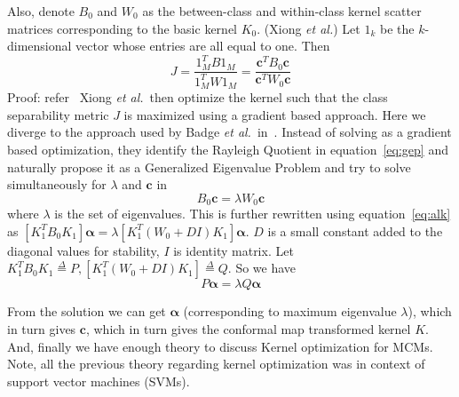 \documentclass[11pt]{article}
\newcommand{\etal}{{\em et al.}}
\begin{document}
Also, denote $B_0$ and $W_0$ as the between\nobreakdash-class and within\nobreakdash-class kernel
scatter matrices corresponding to the basic kernel $K_0$.
{\theorem (Xiong \etal) Let $1_k$ be the $k$\nobreakdash-dimensional vector whose
entries are all equal to one. Then
\begin{equation}
    \label{eq:gep}
    J=\frac{1_M^TB1_M}{1_M^TW1_M}=\frac{\mathbf{c}^TB_0\mathbf{c}}{\mathbf{c}^TW_0\mathbf{c}}
\end{equation}
Proof: refer~\cite{xiong}
}
Xiong \etal\ then optimize the kernel such that the class separability metric $J$
is maximized using a gradient based approach. Here we diverge to the approach
used by Badge \etal\ in~\cite{keropt}. Instead of solving as a gradient based
optimization, they identify the Rayleigh Quotient in equation~\ref{eq:gep} and
naturally propose it as a Generalized Eigenvalue Problem and try to solve
simultaneously for $\lambda$ and $\mathbf{c}$ in
\[B_0\mathbf{c}=\lambda W_0\mathbf{c}
\]
where $\lambda$ is the set of eigenvalues. This is further rewritten using
equation~\ref{eq:alk} as $[K_1^TB_0K_1]\mathbf{\alpha}=\lambda[K_1^T(W_0+DI)K_1]\mathbf{\alpha}$.
$D$ is a small constant added to the diagonal values for stability, $I$ is
identity matrix. Let $K_1^TB_0K_1\stackrel{\Delta}{=}P,
[K_1^T(W_0+DI)K_1]\stackrel{\Delta}{=}Q$. So we have 
\begin{equation}
    \label{eq:GEP}P\mathbf{\alpha}=\lambda Q\mathbf{\alpha}
\end{equation}\par
From the solution we can get $\mathbf{\alpha}$ (corresponding to maximum eigenvalue
$\lambda$), which in turn gives $\mathbf{c}$, which in turn gives the conformal
map transformed kernel $K$. And, finally we have enough theory to discuss Kernel
optimization for MCMs. Note, all the previous theory regarding kernel
optimization was in context of support vector machines (SVMs).
\end{document}
